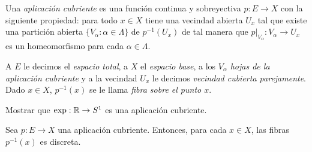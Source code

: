 \begin{definicion}
     Una \textit{aplicación cubriente} es una función continua y sobreyectiva $p:E\to X$  con la siguiente propiedad: para todo $x\in X$ tiene una vecindad abierta $U_x$ tal que existe una partición abierta $\{V_\alpha:\alpha\in \Lambda\}$ de $p^{-1}(U_x)$ de tal manera que $p|_{V_\alpha}:V_\alpha\to U_x$ es un homeomorfismo para cada $\alpha\in\Lambda$.

     A $E$ le decimos el \textit{espacio total}, a $X$ el \textit{espacio base}, a los $V_\alpha$ \textit{hojas de la aplicación cubriente} y a la vecindad $U_x$ le decimos \textit{vecindad cubierta parejamente}. Dado $x\in X$, $p^{-1}(x)$ se le llama \textit{fibra sobre el punto $x$}.
\end{definicion}
\begin{ejercicio}
    Mostrar que $\exp:\mathbb{R}\to S^1$ es una aplicación cubriente.
\end{ejercicio}
\begin{lema}
    Sea $p:E\to X$ una aplicación cubriente. Entonces, para cada $x\in X$, las fibras $p^{-1}(x)$ es discreta.
\end{lema}
